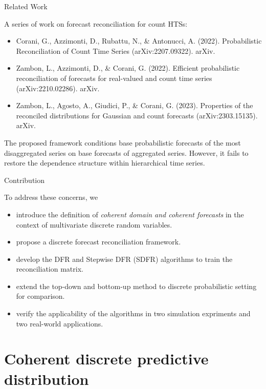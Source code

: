 \documentclass[12pt]{beamer}
\begin{document}
\begin{frame}{Related Work}

A series of work on forecast reconciliation for count HTSs:

\begin{itemize}
    \fontsize{9}{10.2}\selectfont
    \item Corani, G., Azzimonti, D., Rubattu, N., \& Antonucci, A. (2022). Probabilistic Reconciliation of Count Time Series (arXiv:2207.09322). arXiv.
    \item Zambon, L., Azzimonti, D., \& Corani, G. (2022). Efficient probabilistic reconciliation of forecasts for real-valued and count time series (arXiv:2210.02286). arXiv.
    \item Zambon, L., Agosto, A., Giudici, P., \& Corani, G. (2023). Properties of the reconciled distributions for Gaussian and count forecasts (arXiv:2303.15135). arXiv.
\end{itemize}

The proposed framework conditions base probabilistic forecasts of the most disaggregated series on base forecasts of aggregated series. However, it fails to restore the dependence structure within hierarchical time series.

\end{frame}

\begin{frame}{Contribution}

To address these concerns, we 

\begin{itemize}
    \item introduce the definition of \textit{coherent domain and coherent forecasts} in the context of multivariate discrete random variables.
    \item propose a discrete forecast reconciliation framework.
    \item develop the DFR and Stepwise DFR (SDFR) algorithms to train the reconciliation matrix.
    \item extend the top-down and bottom-up method to discrete probabilistic setting for comparison.
    \item verify the applicability of the algorithms in two simulation expriments and two real-world applications.
\end{itemize}

\end{frame}



\section{Coherent discrete predictive distribution}
\end{document}
